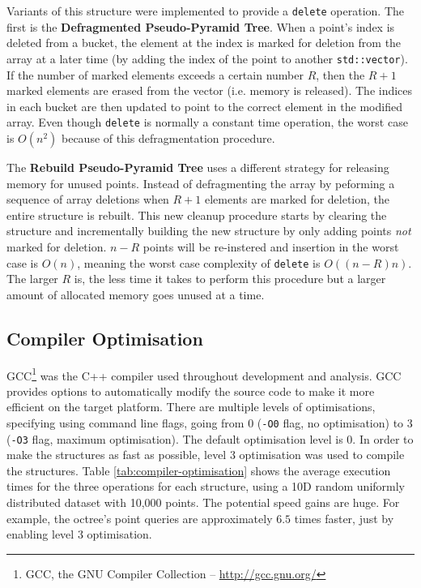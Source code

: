 Variants of this structure were implemented to provide a \texttt{delete} operation. The first is the \textbf{Defragmented Pseudo-Pyramid Tree}. When a point's index is deleted from a bucket, the element at the index is marked for deletion from the array at a later time (by adding the index of the point to another \texttt{std::vector}). If the number of marked elements exceeds a certain number $R$, then the $R + 1$ marked elements are erased from the vector (i.e. memory is released). The indices in each bucket are then updated to point to the correct element in the modified array. Even though \texttt{delete} is normally a constant time operation, the worst case is $O(n^2)$ because of this defragmentation procedure.

The \textbf{Rebuild Pseudo-Pyramid Tree} uses a different strategy for releasing memory for unused points. Instead of defragmenting the array by peforming a sequence of array deletions when $R + 1$ elements are marked for deletion, the entire structure is rebuilt. This new cleanup procedure starts by clearing the structure and incrementally building the new structure by only adding points \textit{not} marked for deletion. $n - R$ points will be re-instered and insertion in the worst case is $O(n)$, meaning the worst case complexity of \texttt{delete} is $O((n - R)n)$. The larger $R$ is, the less time it takes to perform this procedure but a larger amount of allocated memory goes unused at a time.

\subsection{Compiler Optimisation}

GCC\footnote{GCC, the GNU Compiler Collection -- \url{http://gcc.gnu.org/}} was the C++ compiler used throughout development and analysis. GCC provides options to automatically modify the source code to make it more efficient on the target platform. There are multiple levels of optimisations, specifying using command line flags, going from 0 (\texttt{-O0} flag, no optimisation) to 3 (\texttt{-O3} flag, maximum optimisation). The default optimisation level is 0. In order to make the structures as fast as possible, level 3 optimisation was used to compile the structures. Table \ref{tab:compiler-optimisation} shows the average execution times for the three operations for each structure, using a 10D random uniformly distributed dataset with 10,000 points. The potential speed gains are huge. For example, the octree's point queries are approximately $6.5$ times faster, just by enabling level 3 optimisation.

